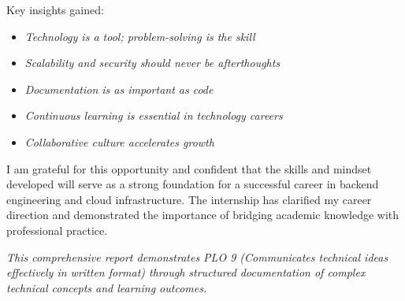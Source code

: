 Key insights gained:
\begin{itemize}
    \item \textit{Technology is a tool; problem-solving is the skill}
    \item \textit{Scalability and security should never be afterthoughts}
    \item \textit{Documentation is as important as code}
    \item \textit{Continuous learning is essential in technology careers}
    \item \textit{Collaborative culture accelerates growth}
\end{itemize}

I am grateful for this opportunity and confident that the skills and mindset developed will serve as a strong foundation for a successful career in backend engineering and cloud infrastructure. The internship has clarified my career direction and demonstrated the importance of bridging academic knowledge with professional practice.

\textit{This comprehensive report demonstrates PLO 9 (Communicates technical ideas effectively in written format) through structured documentation of complex technical concepts and learning outcomes.}
